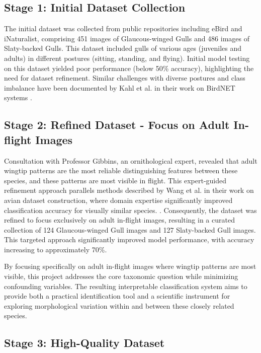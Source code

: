 \documentclass[a4paper,12pt]{report}
\begin{document}
\subsection{Stage 1: Initial Dataset Collection}

The initial dataset was collected from public repositories including eBird and iNaturalist, comprising 451 images of Glaucous-winged Gulls and 486 images of Slaty-backed Gulls. This dataset included gulls of various ages (juveniles and adults) in different postures (sitting, standing, and flying). Initial model testing on this dataset yielded poor performance (below 50\% accuracy), highlighting the need for dataset refinement. Similar challenges with diverse postures and class imbalance have been documented by Kahl et al. in their work on BirdNET systems \citet{kahl2021}.


\subsection{Stage 2: Refined Dataset - Focus on Adult In-flight Images}

Consultation with Professor Gibbins, an ornithological expert, revealed that adult wingtip patterns are the most reliable distinguishing features between these species, and these patterns are most visible in flight. This expert-guided refinement approach parallels methods described by Wang et al. in their work on avian dataset construction, where domain expertise significantly improved classification accuracy for visually similar species. \citet{wang2022}. Consequently, the dataset was refined to focus exclusively on adult in-flight images, resulting in a curated collection of 124 Glaucous-winged Gull images and 127 Slaty-backed Gull images. This targeted approach significantly improved model performance, with accuracy increasing to approximately 70\%.

By focusing specifically on adult in-flight images where wingtip patterns are most visible, this project addresses the core taxonomic question while minimizing confounding variables. The resulting interpretable classification system aims to provide both a practical identification tool and a scientific instrument for exploring morphological variation within and between these closely related species.

\subsection{Stage 3: High-Quality Dataset}
\end{document}
